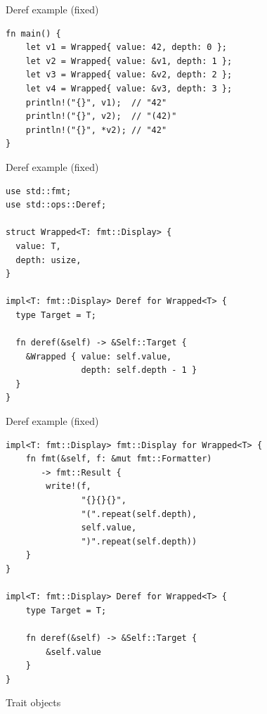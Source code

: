 \documentclass{beamer}
\begin{document}
\begin{frame}[fragile]{Deref example (fixed)}
  \begin{verbatim}
fn main() {
    let v1 = Wrapped{ value: 42, depth: 0 };
    let v2 = Wrapped{ value: &v1, depth: 1 };
    let v3 = Wrapped{ value: &v2, depth: 2 };
    let v4 = Wrapped{ value: &v3, depth: 3 };
    println!("{}", v1);  // "42"
    println!("{}", v2);  // "(42)"
    println!("{}", *v2); // "42"
}
\end{verbatim}
\end{frame}

\begin{frame}[fragile]{Deref example (fixed)}
  \begin{verbatim}
use std::fmt;
use std::ops::Deref;

struct Wrapped<T: fmt::Display> {
  value: T,
  depth: usize,
}

impl<T: fmt::Display> Deref for Wrapped<T> {
  type Target = T;

  fn deref(&self) -> &Self::Target {
    &Wrapped { value: self.value,
               depth: self.depth - 1 }
  }
}
\end{verbatim}
\end{frame}

\begin{frame}[fragile]{Deref example (fixed)}
  \begin{verbatim}
impl<T: fmt::Display> fmt::Display for Wrapped<T> {
    fn fmt(&self, f: &mut fmt::Formatter)
       -> fmt::Result {
        write!(f,
               "{}{}{}",
               "(".repeat(self.depth),
               self.value,
               ")".repeat(self.depth))
    }
}

impl<T: fmt::Display> Deref for Wrapped<T> {
    type Target = T;

    fn deref(&self) -> &Self::Target {
        &self.value
    }
}
\end{verbatim}
\end{frame}

\begin{frame}[standout]
  Trait objects
\end{frame}
\end{document}
